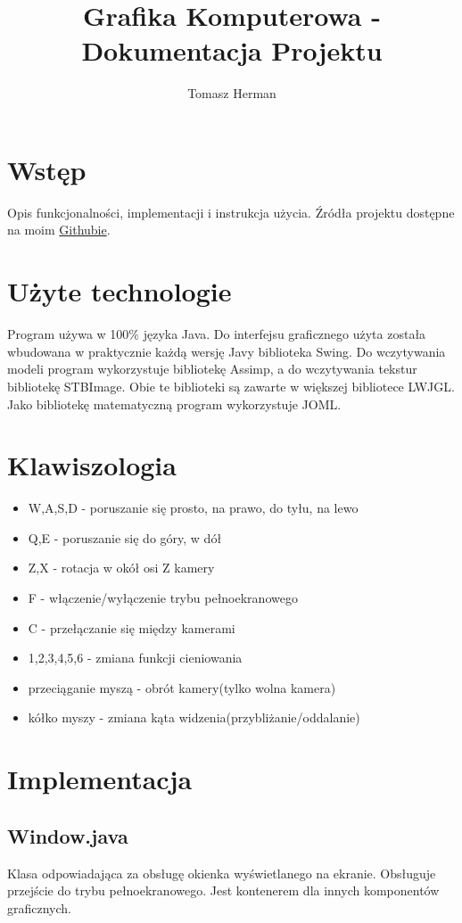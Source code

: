 \documentclass[onecolumn]{article}
\title{Grafika Komputerowa - Dokumentacja Projektu}
\author{Tomasz Herman}
\begin{document}
\maketitle

\section{Wstęp}
Opis funkcjonalności, implementacji i instrukcja użycia. Źródła projektu dostępne na moim \href{https://github.com/tomasz-herman/Mesh}{Githubie}.

\section{Użyte technologie}
Program używa w 100\% języka Java. Do interfejsu graficznego użyta została wbudowana w praktycznie każdą wersję Javy biblioteka Swing. Do wczytywania modeli program wykorzystuje bibliotekę Assimp, a do wczytywania tekstur bibliotekę STBImage. Obie te biblioteki są zawarte w większej bibliotece LWJGL. Jako bibliotekę matematyczną program wykorzystuje JOML.

\section{Klawiszologia}
\begin{itemize}
	\item W,A,S,D - poruszanie się prosto, na prawo, do tyłu, na lewo
	\item Q,E - poruszanie się do góry, w dół
	\item Z,X - rotacja w okół osi Z kamery
	\item F - włączenie/wyłączenie trybu pełnoekranowego
	\item C - przełączanie się między kamerami
	\item 1,2,3,4,5,6 - zmiana funkcji cieniowania
	\item przeciąganie myszą - obrót kamery(tylko wolna kamera)
	\item kółko myszy - zmiana kąta widzenia(przybliżanie/oddalanie)
\end{itemize}

\section{Implementacja}

\subsection{Window.java}
Klasa odpowiadająca za obsługę okienka wyświetlanego na ekranie. Obsługuje przejście do trybu pełnoekranowego. Jest kontenerem dla innych komponentów graficznych.
\end{document}
